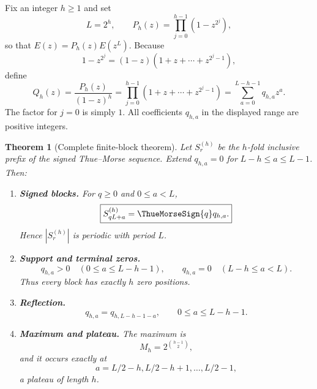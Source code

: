 \documentclass[11pt,oneside]{article}
\numberwithin{equation}{section}
\newtheorem{theorem}{Theorem}[section]
\theoremstyle{definition}
\theoremstyle{remark}
\begin{document}
Fix an integer \(h\ge1\) and set
\begin{equation}
 L=2^h,
 \qquad
 P_h(z)=\prod_{j=0}^{h-1}(1-z^{2^j}),
 \label{p3:a:eq:Ph-L}
\end{equation}
so that \(E(z)=P_h(z)E(z^L)\).  Because
\[
 1-z^{2^j}=(1-z)(1+z+\cdots+z^{2^j-1}),
\]
define
\begin{equation}
 Q_h(z)=\frac{P_h(z)}{(1-z)^h}
 =\prod_{j=0}^{h-1}(1+z+\cdots+z^{2^j-1})
 =\sum_{a=0}^{L-h-1}q_{h,a}z^a.
 \label{p3:a:eq:Qh-definition}
\end{equation}
The factor for \(j=0\) is simply \(1\).  All coefficients
\(q_{h,a}\) in the displayed range are positive integers.

\begin{theorem}[Complete finite-block theorem]\label{p3:a:thm:finite-block}
Let \(S_r^{(h)}\) be the \(h\)-fold inclusive prefix of the signed
Thue--Morse sequence.  Extend \(q_{h,a}=0\) for
\(L-h\le a\le L-1\).  Then:

\begin{enumerate}
\item \textbf{Signed blocks.}  For \(q\ge0\) and \(0\le a<L\),
\begin{equation}
 \boxed{S_{qL+a}^{(h)}=\ThueMorseSign{q} q_{h,a}.}
 \label{p3:a:eq:general-signed-block}
\end{equation}
Hence \(|S_r^{(h)}|\) is periodic with period \(L\).

\item \textbf{Support and terminal zeros.}
\begin{equation}
 q_{h,a}>0\quad(0\le a\le L-h-1),
 \qquad
 q_{h,a}=0\quad(L-h\le a<L).
 \label{p3:a:eq:general-support}
\end{equation}
Thus every block has exactly \(h\) zero positions.

\item \textbf{Reflection.}
\begin{equation}
 q_{h,a}=q_{h,L-h-1-a},
 \qquad 0\le a\le L-h-1.
 \label{p3:a:eq:general-reflection}
\end{equation}

\item \textbf{Maximum and plateau.}  The maximum is
\begin{equation}
 M_h=2^{\binom{h-1}{2}},
 \label{p3:a:eq:general-maximum}
\end{equation}
and it occurs exactly at
\begin{equation}
 a=L/2-h,L/2-h+1,\ldots,L/2-1,
 \label{p3:a:eq:general-plateau}
\end{equation}
a plateau of length \(h\).


\end{enumerate}
\end{theorem}
\end{document}
